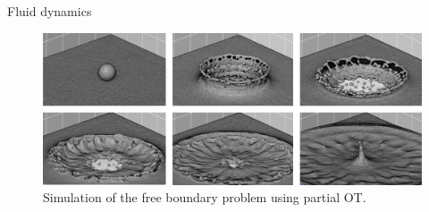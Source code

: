 \begin{frame}{Fluid dynamics}
    \footnotesize
    \begin{figure}
        \centering
        \captionsetup{font=scriptsize}
        \centering
        \includegraphics[width=\textwidth]{png/cfd.jpg}
        \caption{Simulation of the free boundary problem using partial OT.}
    \end{figure}
\end{frame}


